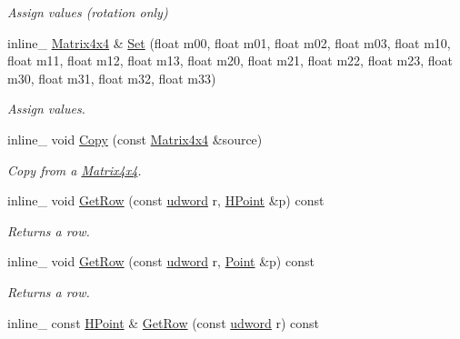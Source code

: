 \begin{DoxyCompactItemize}
\begin{DoxyCompactList}\small\item\em Assign values (rotation only) \end{DoxyCompactList}\item 
inline\+\_\+ \hyperlink{classMatrix4x4}{Matrix4x4} \& \hyperlink{classMatrix4x4_a13789f3a27674890fc8ca5522d899fe3}{Set} (float m00, float m01, float m02, float m03, float m10, float m11, float m12, float m13, float m20, float m21, float m22, float m23, float m30, float m31, float m32, float m33)\hypertarget{classMatrix4x4_a13789f3a27674890fc8ca5522d899fe3}{}\label{classMatrix4x4_a13789f3a27674890fc8ca5522d899fe3}

\begin{DoxyCompactList}\small\item\em Assign values. \end{DoxyCompactList}\item 
inline\+\_\+ void \hyperlink{classMatrix4x4_aea9e8b9bde1c68f00f9e5629d487d17f}{Copy} (const \hyperlink{classMatrix4x4}{Matrix4x4} \&source)\hypertarget{classMatrix4x4_aea9e8b9bde1c68f00f9e5629d487d17f}{}\label{classMatrix4x4_aea9e8b9bde1c68f00f9e5629d487d17f}

\begin{DoxyCompactList}\small\item\em Copy from a \hyperlink{classMatrix4x4}{Matrix4x4}. \end{DoxyCompactList}\item 
inline\+\_\+ void \hyperlink{classMatrix4x4_a341d15f2f21a815d499498fb2dfc05d4}{Get\+Row} (const \hyperlink{IceTypes_8h_a44c6f1920ba5551225fb534f9d1a1733}{udword} r, \hyperlink{classHPoint}{H\+Point} \&p) const \hypertarget{classMatrix4x4_a341d15f2f21a815d499498fb2dfc05d4}{}\label{classMatrix4x4_a341d15f2f21a815d499498fb2dfc05d4}

\begin{DoxyCompactList}\small\item\em Returns a row. \end{DoxyCompactList}\item 
inline\+\_\+ void \hyperlink{classMatrix4x4_a25d5b7ea8d63a5fde36eb2854d0cf1cb}{Get\+Row} (const \hyperlink{IceTypes_8h_a44c6f1920ba5551225fb534f9d1a1733}{udword} r, \hyperlink{classPoint}{Point} \&p) const \hypertarget{classMatrix4x4_a25d5b7ea8d63a5fde36eb2854d0cf1cb}{}\label{classMatrix4x4_a25d5b7ea8d63a5fde36eb2854d0cf1cb}

\begin{DoxyCompactList}\small\item\em Returns a row. \end{DoxyCompactList}\item 
inline\+\_\+ const \hyperlink{classHPoint}{H\+Point} \& \hyperlink{classMatrix4x4_a37e34d7c04a4353678634846326ba275}{Get\+Row} (const \hyperlink{IceTypes_8h_a44c6f1920ba5551225fb534f9d1a1733}{udword} r) const \hypertarget{classMatrix4x4_a37e34d7c04a4353678634846326ba275}{}\label{classMatrix4x4_a37e34d7c04a4353678634846326ba275}


\end{DoxyCompactItemize}
